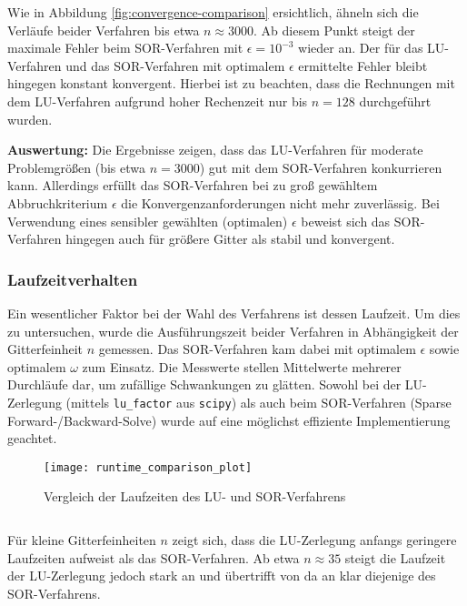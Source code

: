 \documentclass{scrartcl}
\newenvironment{code}{\captionsetup{type=listing}}{}
\begin{document}
Wie in Abbildung \ref{fig:convergence-comparison} ersichtlich, ähneln sich die
Verläufe beider Verfahren bis etwa \(n \approx 3000\). Ab diesem Punkt steigt
der maximale Fehler beim SOR-Verfahren mit \(\epsilon = 10^{-3}\) wieder an.
Der für das LU-Verfahren und das SOR-Verfahren mit optimalem \(\epsilon\)
ermittelte Fehler bleibt hingegen konstant konvergent. Hierbei ist zu beachten,
dass die Rechnungen mit dem LU-Verfahren aufgrund hoher Rechenzeit nur bis \(n
= 128\) durchgeführt wurden.

\textbf{Auswertung:}
Die Ergebnisse zeigen, dass das LU-Verfahren für moderate Problemgrößen (bis
etwa \(n = 3000\)) gut mit dem SOR-Verfahren konkurrieren kann. Allerdings
erfüllt das SOR-Verfahren bei zu groß gewähltem Abbruchkriterium \(\epsilon\)
die Konvergenzanforderungen nicht mehr zuverlässig. Bei Verwendung eines
sensibler gewählten (optimalen) \(\epsilon\) beweist sich das SOR-Verfahren
hingegen auch für größere Gitter als stabil und konvergent.

\subsubsection{Laufzeitverhalten}

Ein wesentlicher Faktor bei der Wahl des Verfahrens ist dessen Laufzeit. Um
dies zu untersuchen, wurde die Ausführungszeit beider Verfahren in Abhängigkeit
der Gitterfeinheit \(n\) gemessen. Das SOR-Verfahren kam dabei mit optimalem
\(\epsilon\) sowie optimalem \(\omega\) zum Einsatz. Die Messwerte stellen
Mittelwerte mehrerer Durchläufe dar, um zufällige Schwankungen zu glätten.
Sowohl bei der LU-Zerlegung (mittels \texttt{lu\_factor} aus \texttt{scipy})
als auch beim SOR-Verfahren (Sparse Forward-/Backward-Solve) wurde auf eine
möglichst effiziente Implementierung geachtet.

\begin{figure}[H]
    \centering
    \texttt{[image: runtime\_comparison\_plot]}
    \caption{Vergleich der Laufzeiten des LU- und SOR-Verfahrens}
    \label{fig:runtime-comparison}
\end{figure}

\begin{code}
    \label{code:runtime-comparison}
    \inputminted[firstline=38, lastline=42]{bash}{figures/generate.sh}
\end{code}

Für kleine Gitterfeinheiten \(n\) zeigt sich, dass die LU-Zerlegung anfangs
geringere Laufzeiten aufweist als das SOR-Verfahren. Ab etwa \(n \approx 35\)
steigt die Laufzeit der LU-Zerlegung jedoch stark an und übertrifft von da an
klar diejenige des SOR-Verfahrens.
\end{document}
